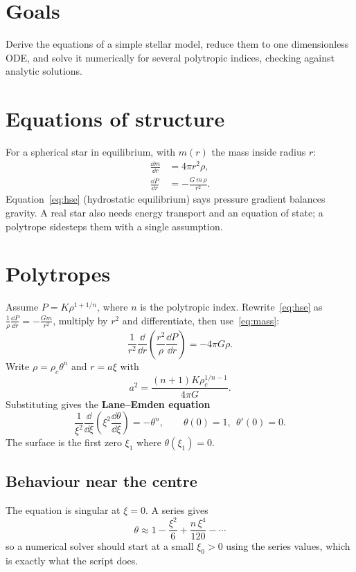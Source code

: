 


\section*{Goals}
Derive the equations of a simple stellar model, reduce them to one dimensionless ODE, and solve it numerically for several polytropic indices, checking against analytic solutions.

\section{Equations of structure}
For a spherical star in equilibrium, with $m(r)$ the mass inside radius $r$:
\begin{align}
\frac{\dd m}{\dd r} &= 4\pi r^2\rho, \label{eq:mass}\\
\frac{\dd P}{\dd r} &= -\frac{G\,m\,\rho}{r^2}. \label{eq:hse}
\end{align}
Equation~\eqref{eq:hse} (hydrostatic equilibrium) says pressure gradient balances gravity. A real star also needs energy transport and an equation of state; a polytrope sidesteps them with a single assumption.

\section{Polytropes}
Assume $P = K\rho^{1+1/n}$, where $n$ is the polytropic index. Rewrite~\eqref{eq:hse} as $\frac{1}{\rho}\frac{\dd P}{\dd r}=-\frac{Gm}{r^2}$, multiply by $r^2$ and differentiate, then use~\eqref{eq:mass}:
\[
\frac{1}{r^2}\frac{\dd}{\dd r}\!\left(\frac{r^2}{\rho}\frac{\dd P}{\dd r}\right) = -4\pi G\rho .
\]
Write $\rho=\rho_c\theta^n$ and $r=a\xi$ with
\[
a^2=\frac{(n+1)K\rho_c^{1/n-1}}{4\pi G}.
\]
Substituting gives the \textbf{Lane--Emden equation}
\[
\frac{1}{\xi^2}\frac{\dd}{\dd\xi}\!\left(\xi^2\frac{\dd\theta}{\dd\xi}\right) = -\theta^n,
\qquad \theta(0)=1,\ \ \theta'(0)=0 .
\]
The surface is the first zero $\xi_1$ where $\theta(\xi_1)=0$.

\subsection*{Behaviour near the centre}
The equation is singular at $\xi=0$. A series gives
\[
\theta \approx 1 - \frac{\xi^2}{6} + \frac{n\,\xi^4}{120} - \cdots
\]
so a numerical solver should start at a small $\xi_0>0$ using the series values, which is exactly what the script does.

